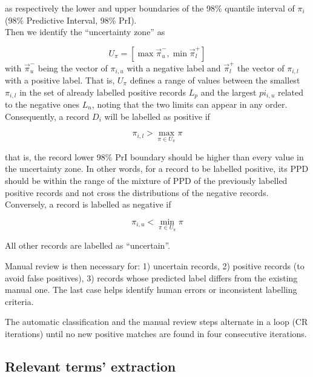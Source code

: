 \documentclass{article}
\begin{document}
as respectively the lower and upper boundaries of the 98\% quantile
interval of \(\pi_i\) (98\% Predictive Interval, 98\% PrI).\\
Then we identify the ``uncertainty zone'' as

\[U_\pi=[\max\vec{\pi}_{u}^-, \min\vec{\pi}_{l}^+]\] with
\(\vec{\pi}_{u}^-\) being the vector of \(\pi_{i,u}\) with a negative
label and \(\vec{\pi}_{l}^+\) the vector of \(\pi_{i,l}\) with a
positive label. That is, \(U_\pi\) defines a range of values between the
smallest \(\pi_{i,l}\) in the set of already labelled positive records
\(L_p\) and the largest \(pi_{i,u}\) related to the negative ones
\(L_n\), noting that the two limits can appear in any order.\\
Consequently, a record \(D_i\) will be labelled as positive if

\[\pi_{i,l} > \max_{\pi \in U_\pi} \pi\]

that is, the record lower 98\% PrI boundary should be higher than every
value in the uncertainty zone. In other words, for a record to be
labelled positive, its PPD should be within the range of the mixture of
PPD of the previously labelled positive records and not cross the
distributions of the negative records.\\
Conversely, a record is labelled as negative if

\[\pi_{i,u} < \min_{\pi \in U_\pi} \pi\]

All other records are labelled as ``uncertain''.

Manual review is then necessary for: 1) uncertain records, 2) positive
records (to avoid false positives), 3) records whose predicted label
differs from the existing manual one. The last case helps identify human
errors or inconsistent labelling criteria.

The automatic classification and the manual review steps alternate in a
loop (CR iterations) until no new positive matches are found in four
consecutive iterations.

\hypertarget{relevant-terms-extraction}{%
\subsection{Relevant terms'
extraction}\label{relevant-terms-extraction}}
\end{document}

